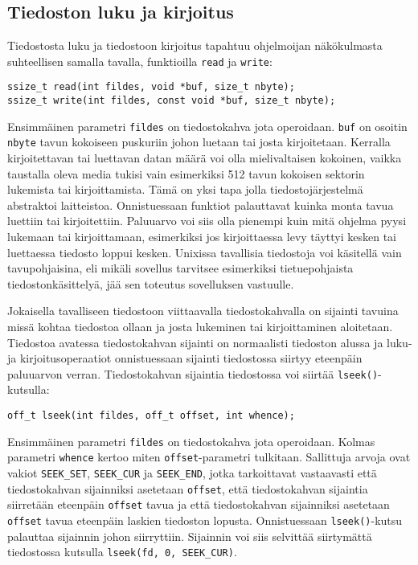 \subsection{Tiedoston luku ja kirjoitus}

Tiedostosta luku ja tiedostoon kirjoitus tapahtuu ohjelmoijan näkökulmasta suhteellisen
samalla tavalla, funktioilla \texttt{read} ja \texttt{write}:

\begin{verbatim}
ssize_t read(int fildes, void *buf, size_t nbyte);
ssize_t write(int fildes, const void *buf, size_t nbyte);
\end{verbatim}
%
Ensimmäinen parametri \texttt{fildes} on tiedostokahva jota operoidaan.
\texttt{buf} on osoitin \texttt{nbyte} tavun kokoiseen puskuriin johon
luetaan tai josta kirjoitetaan.
Kerralla kirjoitettavan tai luettavan datan määrä voi olla mielivaltaisen kokoinen,
vaikka taustalla oleva media tukisi vain esimerkiksi 512 tavun kokoisen sektorin lukemista tai kirjoittamista.
Tämä on yksi tapa jolla tiedostojärjestelmä abstraktoi laitteistoa.
Onnistuessaan funktiot palauttavat kuinka monta tavua luettiin tai kirjoitettiin.
Paluuarvo voi siis olla pienempi kuin mitä ohjelma pyysi lukemaan tai kirjoittamaan,
esimerkiksi jos kirjoittaessa levy täyttyi kesken tai luettaessa
tiedosto loppui kesken.
Unixissa tavallisia tiedostoja voi käsitellä vain tavupohjaisina,
eli mikäli sovellus tarvitsee esimerkiksi tietuepohjaista tiedostonkäsittelyä,
jää sen toteutus sovelluksen vastuulle.

Jokaisella tavalliseen tiedostoon viittaavalla tiedostokahvalla on sijainti tavuina missä kohtaa tiedostoa ollaan ja josta lukeminen tai kirjoittaminen aloitetaan.
Tiedostoa avatessa tiedostokahvan sijainti on normaalisti tiedoston alussa ja luku- ja kirjoitusoperaatiot onnistuessaan sijainti tiedostossa siirtyy eteenpäin paluuarvon verran.
Tiedostokahvan sijaintia tiedostossa voi siirtää \texttt{lseek()}-kutsulla:

\begin{verbatim}
off_t lseek(int fildes, off_t offset, int whence);
\end{verbatim}
Ensimmäinen parametri \texttt{fildes} on tiedostokahva jota operoidaan.
Kolmas parametri \texttt{whence} kertoo miten \texttt{offset}-parametri tulkitaan.
Sallittuja arvoja ovat vakiot \texttt{SEEK\_SET}, \texttt{SEEK\_CUR} ja \texttt{SEEK\_END},
jotka tarkoittavat vastaavasti että tiedostokahvan sijainniksi asetetaan \texttt{offset},
että tiedostokahvan sijaintia siirretään eteenpäin \texttt{offset} tavua ja
että tiedostokahvan sijainniksi asetetaan \texttt{offset} tavua eteenpäin laskien tiedoston lopusta.
Onnistuessaan \texttt{lseek()}-kutsu palauttaa sijainnin johon siirryttiin.
Sijainnin voi siis selvittää siirtymättä tiedostossa kutsulla \texttt{lseek(fd, 0, SEEK\_CUR)}.

